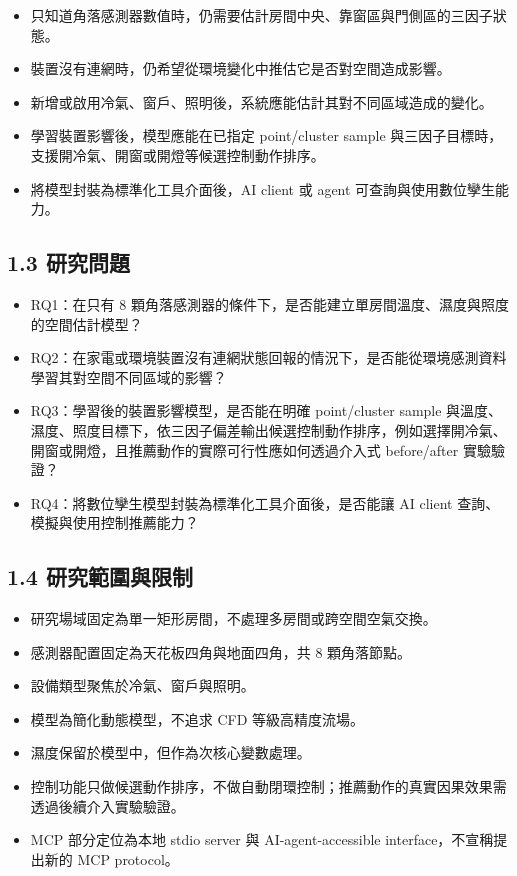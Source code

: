 \documentclass[12pt,a4paper]{article}
\begin{document}
\begin{itemize}
\item 只知道角落感測器數值時，仍需要估計房間中央、靠窗區與門側區的三因子狀態。
\item 裝置沒有連網時，仍希望從環境變化中推估它是否對空間造成影響。
\item 新增或啟用冷氣、窗戶、照明後，系統應能估計其對不同區域造成的變化。
\item 學習裝置影響後，模型應能在已指定 point/cluster sample 與三因子目標時，支援開冷氣、開窗或開燈等候選控制動作排序。
\item 將模型封裝為標準化工具介面後，AI client 或 agent 可查詢與使用數位孿生能力。
\end{itemize}

\subsection*{1.3 研究問題}

\begin{itemize}
\item RQ1：在只有 8 顆角落感測器的條件下，是否能建立單房間溫度、濕度與照度的空間估計模型？
\item RQ2：在家電或環境裝置沒有連網狀態回報的情況下，是否能從環境感測資料學習其對空間不同區域的影響？
\item RQ3：學習後的裝置影響模型，是否能在明確 point/cluster sample 與溫度、濕度、照度目標下，依三因子偏差輸出候選控制動作排序，例如選擇開冷氣、開窗或開燈，且推薦動作的實際可行性應如何透過介入式 before/after 實驗驗證？
\item RQ4：將數位孿生模型封裝為標準化工具介面後，是否能讓 AI client 查詢、模擬與使用控制推薦能力？
\end{itemize}

\subsection*{1.4 研究範圍與限制}

\begin{itemize}
\item 研究場域固定為單一矩形房間，不處理多房間或跨空間空氣交換。
\item 感測器配置固定為天花板四角與地面四角，共 8 顆角落節點。
\item 設備類型聚焦於冷氣、窗戶與照明。
\item 模型為簡化動態模型，不追求 CFD 等級高精度流場。
\item 濕度保留於模型中，但作為次核心變數處理。
\item 控制功能只做候選動作排序，不做自動閉環控制；推薦動作的真實因果效果需透過後續介入實驗驗證。
\item MCP 部分定位為本地 stdio server 與 AI-agent-accessible interface，不宣稱提出新的 MCP protocol。
\end{itemize}
\end{document}
